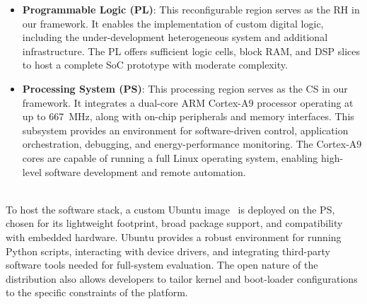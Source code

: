             \vspace{-1em}
            \begin{itemize}
                \item \textbf{Programmable Logic (PL)}: This reconfigurable region serves as the RH in our framework. It enables the implementation of custom digital logic, including the under-development heterogeneous system and additional infrastructure. The PL offers sufficient logic cells, block RAM, and DSP slices to host a complete SoC prototype with moderate complexity.
                
                \item \textbf{Processing System (PS)}: This processing region serves as the CS in our framework. It integrates a dual-core ARM Cortex-A9 processor operating at up to \SI{667}{\mega\hertz}, along with on-chip peripherals and memory interfaces. This subsystem provides an environment for software-driven control, application orchestration, debugging, and energy-performance monitoring. The Cortex-A9 cores are capable of running a full Linux operating system, enabling high-level software development and remote automation.\\\\
            \end{itemize}
            \vspace{-1em}
            
            To host the software stack, a custom \mbox{Ubuntu} image~\cite{sd_image} is deployed on the PS, chosen for its lightweight footprint, broad package support, and compatibility with embedded hardware. Ubuntu provides a robust environment for running Python scripts, interacting with device drivers, and integrating third-party software tools needed for full-system evaluation. The open nature of the distribution also allows developers to tailor kernel and boot-loader configurations to the specific constraints of the platform.

